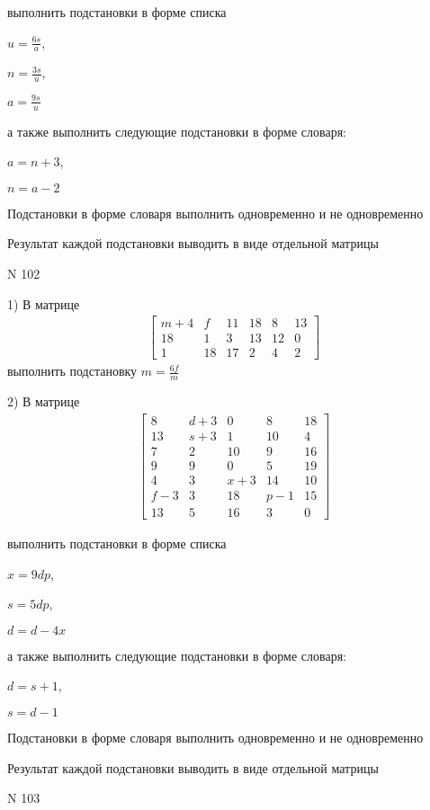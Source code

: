 \documentclass[11pt]{report}
\begin{document}
выполнить подстановки в форме списка

$u=\frac{6 s}{a}$,

$n=\frac{3 s}{u}$,

$a=\frac{9 s}{u}$

а также выполнить следующие подстановки в форме словаря:

$a=n + 3$,

$n=a - 2$


    Подстановки в форме словаря выполнить одновременно и не одновременно


    Результат каждой подстановки выводить в виде отдельной матрицы

\newpage
N 102


    1) В матрице
\begin{align*}
\left[\begin{matrix}m + 4 & f & 11 & 18 & 8 & 13\\18 & 1 & 3 & 13 & 12 & 0\\1 & 18 & 17 & 2 & 4 & 2\end{matrix}\right]
\end{align*}
выполнить подстановку $m=\frac{6 f}{m}$


    2) В матрице
\begin{align*}
\left[\begin{matrix}8 & d + 3 & 0 & 8 & 18\\13 & s + 3 & 1 & 10 & 4\\7 & 2 & 10 & 9 & 16\\9 & 9 & 0 & 5 & 19\\4 & 3 & x + 3 & 14 & 10\\f - 3 & 3 & 18 & p - 1 & 15\\13 & 5 & 16 & 3 & 0\end{matrix}\right]
\end{align*}

выполнить подстановки в форме списка

$x=9 d p$,

$s=5 d p$,

$d=d - 4 x$

а также выполнить следующие подстановки в форме словаря:

$d=s + 1$,

$s=d - 1$


    Подстановки в форме словаря выполнить одновременно и не одновременно


    Результат каждой подстановки выводить в виде отдельной матрицы

\newpage
N 103
\end{document}
